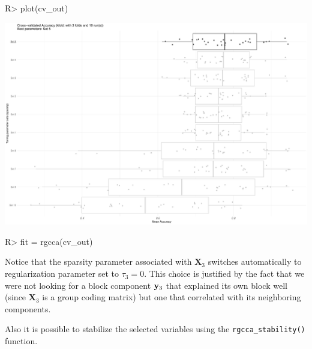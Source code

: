 \documentclass[
]{jss}
\begin{document}
\normalsize

\footnotesize

\begin{CodeChunk}
\begin{CodeInput}
R> plot(cv_out)
\end{CodeInput}


\begin{center}\includegraphics{RGCCA_21022023_files/figure-latex/unnamed-chunk-42-1} \end{center}

\end{CodeChunk}

\normalsize

\footnotesize

\begin{CodeChunk}
\begin{CodeInput}
R> fit = rgcca(cv_out)
\end{CodeInput}
\end{CodeChunk}

\normalsize

Notice that the sparsity parameter associated with \(\mathbf{X}_3\)
switches automatically to regularization parameter set to
\(\tau_3 = 0\). This choice is justified by the fact that we were not
looking for a block component \(\mathbf{y}_3\) that explained its own block well
(since \(\mathbf{X}_3\) is a group coding matrix) but one that
correlated with its neighboring components.

Also it is possible to stabilize the selected variables using the
\texttt{rgcca\_stability()} function.

\footnotesize

\begin{CodeChunk}
\end{CodeChunk}
\end{document}
